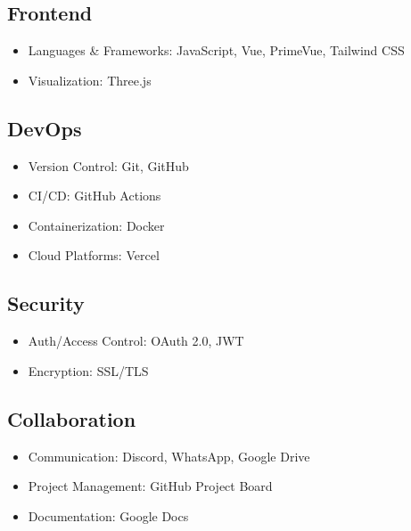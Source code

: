 \documentclass{article}
\begin{document}
\subsection{Frontend}
\begin{itemize}
    \item Languages \& Frameworks: JavaScript, Vue, PrimeVue, Tailwind CSS
    \item Visualization: Three.js
\end{itemize}

\subsection{DevOps}
\begin{itemize}
    \item Version Control: Git, GitHub
    \item CI/CD: GitHub Actions
    \item Containerization: Docker
    \item Cloud Platforms: Vercel
\end{itemize}

\subsection{Security}
\begin{itemize}
    \item Auth/Access Control: OAuth 2.0, JWT
    \item Encryption: SSL/TLS
\end{itemize}

\subsection{Collaboration}
\begin{itemize}
    \item Communication: Discord, WhatsApp, Google Drive
    \item Project Management: GitHub Project Board
    \item Documentation: Google Docs
\end{itemize}

\
\end{document}
